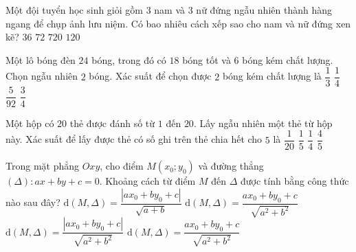 \begin{ex}%
Một đội tuyển học sinh giỏi gồm $3$ nam và $3$ nữ đứng ngẫu nhiên thành hàng ngang để chụp ảnh lưu niệm. Có bao nhiêu cách xếp sao cho nam và nữ đứng xen kẽ?
\choice
{$36$}
{\True $72$}
{$720$}
{$120$}
\end{ex}
\begin{ex}%
Một lô bóng đèn $24$ bóng, trong đó có $18$ bóng tốt và $6$ bóng kém chất lượng. Chọn ngẫu nhiên $2$ bóng. Xác suất để chọn được $2$ bóng kém chất lượng là
\choice
{$\dfrac{1}{3}$}
{$\dfrac{1}{4}$}
{\True $\dfrac{5}{92}$}
{$\dfrac{3}{4}$}
\end{ex}
\begin{ex}%
Một hộp có $20$ thẻ được đánh số từ $1$ đến $20$. Lấy ngẫu nhiên một thẻ từ hộp này. Xác suất để lấy được thẻ có số ghi trên thẻ chia hết cho $5$ là
\choice
{$\dfrac{1}{20}$}
{\True $\dfrac{1}{5}$}
{$\dfrac{1}{4}$}
{$\dfrac{4}{5}$}
\end{ex}
\begin{ex}%
Trong mặt phẳng $Oxy$, cho điểm $M\left(x_0;y_0\right)$ và đường thẳng $(\Delta)\colon ax+by+c=0$. Khoảng cách từ điểm $M$ đến $\Delta$ được tính bằng công thức nào sau đây?
\choice
{$\mathrm{d}(M, \Delta)=\dfrac{\left|ax_0+b y_0+c\right|}{\sqrt{a+b}}$}
{$\mathrm{d}(M, \Delta)=\dfrac{ax_0+by_0+c}{\sqrt{a^2+b^2}}$}
{\True $\mathrm{d}(M, \Delta)=\dfrac{\left|ax_0+by_0+c\right|}{\sqrt{a^2+b^2}}$}
{$\mathrm{d}(M, \Delta)=\dfrac{ax_0+by_0+c}{\sqrt{a^2+b^2}}$}
\end{ex}
